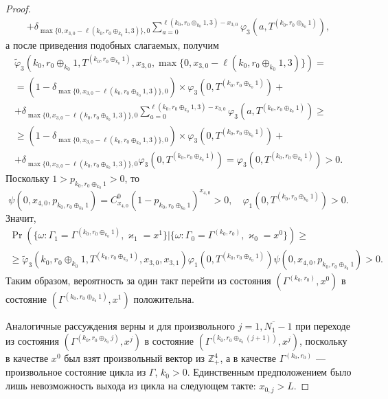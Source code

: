 \begin{proof}
\begin{multline*}
+\delta_{\max{\{0,  x_{3,  0} - \ell(k_0,  r_0\oplus_{k_0}1,  3)\}}, 0} \sum_{a=0}^{\ell(k_0,  r_0\oplus_{k_0}1,  3)-x_{3,  0}}\varphi_3 (a, T^{(k_0,  r_0\oplus_{k_0}1)}), 
\end{multline*}
а после приведения подобных слагаемых,  получим
\begin{multline*}
\widetilde{\varphi}_3(k_0,  r_0\oplus_{k_0}1,  T^{(k_0,  r_0\oplus_{k_0}1)},  x_{3, 0},  \max{\{0,  x_{3, 0} - \ell(k_0,  r_0\oplus_{k_0}1,  3)\}})=\\=(1-\delta_{\max{\{0,  x_{3, 0} - \ell(k_0,  r_0\oplus_{k_0}1,  3)\}}, 0}) \times \varphi_3(0,  T^{(k_0,  r_0\oplus_{k_0}1)} ) +\\
+\delta_{\max{\{0,  x_{3, 0} - \ell(k_0,  r_0\oplus_{k_0}1,  3)\}}, 0} \sum_{a=0}^{\ell(k_0,  r_0\oplus_{k_0}1,  3)-x_{3,  0}}\varphi_3 (a, T^{(k_0,  r_0\oplus_{k_0}1)}) \geqslant \\ 
\geqslant (1-\delta_{\max{\{0,  x_{3,  0} - \ell(k_0,  r_0\oplus_{k_0}1,  3)\}}, 0}) \times \varphi_3(0,  T^{(k_0,  r_0\oplus_{k_0}1)} ) + \\
+\delta_{\max{\{0,  x_{3,  0} - \ell(k_0,  r_0\oplus_{k_0}1,  3)\}}, 0} \varphi_3 (0,  T^{(k_0,  r_0\oplus_{k_0}1)}) = \varphi_3 (0,  T^{(k_0,  r_0\oplus_{k_0}1)})
>0.
\end{multline*}
Поскольку $1 > p_{k_0, r_0\oplus_{k_0}1} > 0$,  то 
$$\psi(0, x_{4, 0},  p_{k_0, r_0\oplus_{k_0}1}) = C_{x_{4, 0}}^{0} (1-p_{k_0, r_0\oplus_{k_0}1})^{x_{4, 0}} > 0,  \quad \varphi_1(0, T^{(k_0, r_0\oplus_{k_0}1)}) > 0.$$
Значит, 
\begin{multline*}
\Pr (\{\omega\colon \Gamma_{1}=\Gamma^{(k_0,  r_0\oplus_{k_0}1)}, \varkappa_{1}=x^1\} | \{\omega\colon \Gamma_{0}=\Gamma^{(k_0,  r_0)},  \varkappa_0=x^0\})\geqslant \\
\geqslant \widetilde{\varphi}_3(k_0,  r_0\oplus_{k_0}1,  T^{(k_0, r_0\oplus_{k_0}1)},  x_{3, 0},  x_{3, 1})
\varphi_1(0, T^{(k_0,  r_0\oplus_{k_0}1)})  \psi(0,  x_{4, 0},  p_{k_0,  r_0\oplus_{k_0}1}) > 0.
\end{multline*}
Таким образом,  вероятность за один такт перейти из состояния $(\Gamma^{(k_0,  r_0)},  x^0)$ в состояние $ (\Gamma^{(k_0,  r_0\oplus_{k_0}1)},  x^1)$ положительна.

Аналогичные рассуждения верны и для произвольного $j=\overline{1,  N_1-1}$
при переходе из состояния $(\Gamma^{(k_0,  r_0\oplus_{k_0} j)},  x^j)$ в состояние $(\Gamma^{(k_0,  r_0\oplus_{k_0}(j+1))},  x^j)$,  поскольку в качестве $x^0$ был взят произвольный вектор из $\mathbb{Z}_+^4$,  а в качестве $\Gamma^{(k_0,  r_0)}$ --- произвольное состояние цикла из $\Gamma$,  $k_0>0$. Единственным предположением было лишь невозможность выхода из цикла на следующем такте: $x_{0,  j} > L$.


\end{proof}

